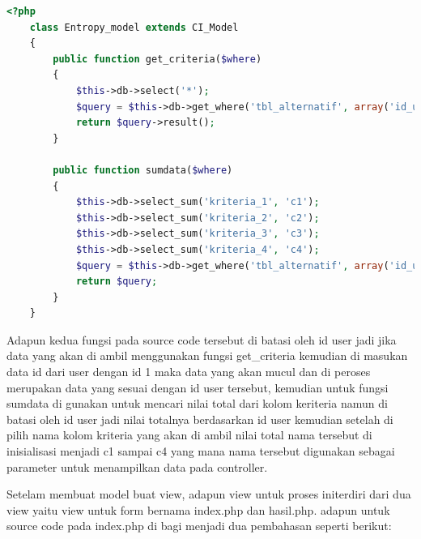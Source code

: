 \begin{lstlisting}[language=PHP]
	<?php  
	class Entropy_model extends CI_Model  
	{  
	    public function get_criteria($where)  
	    {  
	        $this->db->select('*');  
	        $query = $this->db->get_where('tbl_alternatif', array('id_user' => $where));  
	        return $query->result();  
	    }  
	  
	    public function sumdata($where)  
	    {  
	        $this->db->select_sum('kriteria_1', 'c1');  
	        $this->db->select_sum('kriteria_2', 'c2');  
	        $this->db->select_sum('kriteria_3', 'c3');  
	        $this->db->select_sum('kriteria_4', 'c4');  
	        $query = $this->db->get_where('tbl_alternatif', array('id_user' => $where));  
	        return $query;  
	    }  
	}  
\end{lstlisting}

Adapun kedua fungsi pada source code tersebut di batasi oleh id user jadi jika data yang akan di ambil menggunakan fungsi get\_criteria kemudian di masukan data id dari user dengan id 1 maka data yang akan mucul dan di peroses merupakan data yang sesuai dengan id user tersebut, kemudian untuk fungsi sumdata di gunakan untuk mencari nilai total dari kolom keriteria namun di batasi oleh id user jadi nilai totalnya berdasarkan id user kemudian setelah di pilih nama kolom kriteria yang akan di ambil nilai total nama tersebut di inisialisasi menjadi c1 sampai c4 yang mana nama tersebut digunakan sebagai parameter untuk menampilkan data pada controller.\par 
	Setelam membuat model buat view, adapun view untuk proses initerdiri dari dua view yaitu view untuk form bernama index.php dan hasil.php. adapun untuk source code pada index.php di bagi menjadi dua pembahasan seperti berikut:

